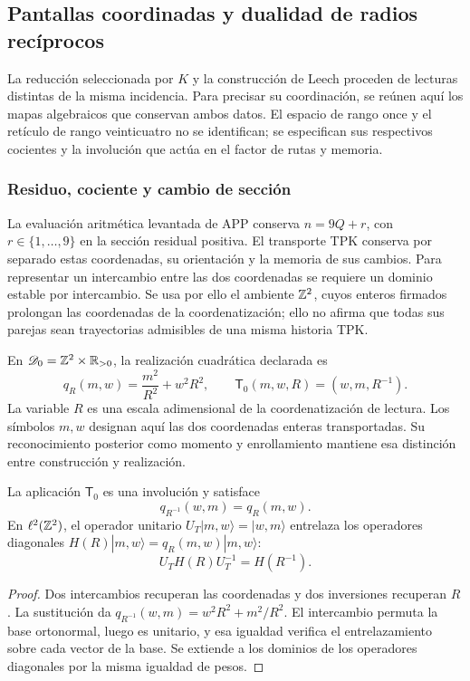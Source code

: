 \subsection{Pantallas coordinadas y dualidad de radios recíprocos}
\label{exc:pantallas-dualidad}

La reducción seleccionada por \(K\) y la construcción de Leech
proceden de lecturas distintas de la misma incidencia. Para precisar
su coordinación, se reúnen aquí los mapas algebraicos que conservan
ambos datos. El espacio de rango once y el retículo de rango veinticuatro
no se identifican; se especifican sus respectivos cocientes y la
involución que actúa en el factor de rutas y memoria.

\subsubsection{Residuo, cociente y cambio de sección}

La evaluación aritmética levantada de APP conserva
\(n=9Q+r\), con \(r\in\{1,\ldots,9\}\) en la sección
residual positiva. El transporte TPK conserva por separado estas
coordenadas, su orientación y la memoria de sus cambios. Para
representar un intercambio entre las dos coordenadas se requiere
un dominio estable por intercambio. Se usa por ello el ambiente
\(\mathbb Z^2\), cuyos enteros firmados prolongan las coordenadas de
la coordenatización; ello no afirma que todas sus parejas sean trayectorias
admisibles de una misma historia TPK.

En \(\mathscr D_0=\mathbb Z^2\times\mathbb R_{>0}\), la realización cuadrática
declarada es
\begin{equation}
 q_R(m,w)=\frac{m^2}{R^2}+w^2R^2,
 \qquad \mathsf T_0(m,w,R)=(w,m,R^{-1}).
 \label{eq:dualidad-normalizada-k}
\end{equation}
La variable \(R\) es una escala adimensional de la coordenatización de lectura.
Los símbolos \(m,w\) designan aquí las dos coordenadas enteras
transportadas. Su reconocimiento posterior como momento y enrollamiento
mantiene esa distinción entre construcción y realización.

\begin{proposition}
\label{prop:dualidad-radios-k}
La aplicación \(\mathsf T_0\) es una involución y satisface
\[
 q_{R^{-1}}(w,m)=q_R(m,w).
\]
En \(\ell^2(\mathbb Z^2)\), el operador unitario
\(U_T|m,w\rangle=|w,m\rangle\) entrelaza los operadores
diagonales \(H(R)|m,w\rangle=q_R(m,w)|m,w\rangle\):
\[
 U_TH(R)U_T^{-1}=H(R^{-1}).
\]
\end{proposition}
\begin{proof}
Dos intercambios recuperan las coordenadas y dos inversiones recuperan
\(R\). La sustitución da
\(q_{R^{-1}}(w,m)=w^2R^2+m^2/R^2\). El intercambio permuta
la base ortonormal, luego es unitario, y esa igualdad verifica el
entrelazamiento sobre cada vector de la base. Se extiende a los
dominios de los operadores diagonales por la misma igualdad de pesos.
\end{proof}


